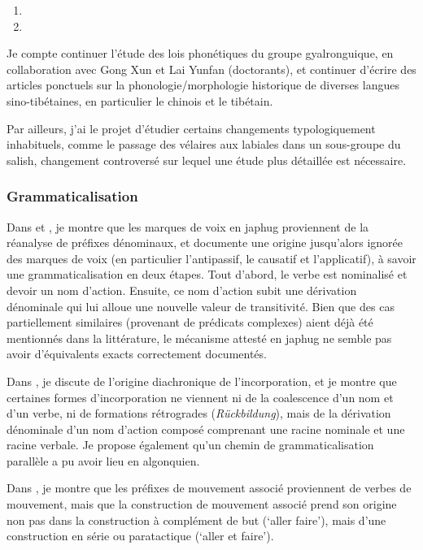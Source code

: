 \documentclass[oldfontcommands,oneside,a4paper,11pt]{article}
\begin{document}
\begin{enumerate}
 \item  {}
 \item {}
\end{enumerate}

Je compte continuer l'étude des lois phonétiques du groupe gyalronguique, en collaboration avec Gong Xun et Lai Yunfan (doctorants), et continuer d'écrire des articles ponctuels sur la phonologie/morphologie historique de diverses langues sino-tibétaines, en particulier le chinois et le tibétain.


Par ailleurs, j'ai le projet d'étudier certains changements typologiquement inhabituels, comme le passage des vélaires aux labiales dans un sous-groupe du salish, changement controversé sur lequel une étude plus détaillée est nécessaire.
         
\subsubsection{Grammaticalisation}


Dans \citet{jacques14antipassive} et \citet{jacques15causative}, je montre que les marques de voix en japhug proviennent de la réanalyse de préfixes dénominaux, et documente une origine jusqu'alors ignorée des marques de voix (en particulier l'antipassif, le causatif et l'applicatif), à savoir une grammaticalisation en deux étapes. Tout d'abord, le verbe est nominalisé et devoir un nom d'action. Ensuite, ce nom d'action subit une dérivation dénominale qui lui alloue une nouvelle valeur de transitivité. Bien que des cas partiellement similaires (provenant de prédicats complexes) aient déjà été mentionnés dans la littérature, le mécanisme attesté en japhug ne semble pas avoir d'équivalents exacts correctement documentés.


Dans \citet{jacques12incorp}, je discute de l'origine diachronique de l'incorporation, et je montre que certaines formes d'incorporation ne viennent ni de la coalescence d'un nom et d'un verbe, ni de formations rétrogrades (\textit{Rückbildung}), mais de la dérivation dénominale d'un nom d'action composé comprenant une racine nominale et une racine verbale. Je propose également qu'un chemin de grammaticalisation parallèle a pu avoir lieu en algonquien.

Dans \citet{jacques13harmonization}, je montre que les préfixes de mouvement associé proviennent de verbes de mouvement, mais que la construction de mouvement associé prend son origine non pas dans la construction à complément de but (`aller faire'), mais d'une construction en série ou paratactique (`aller et faire').
\end{document}
